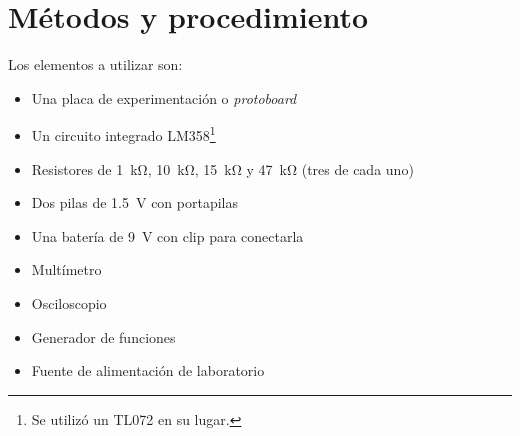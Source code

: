 \section{Métodos y procedimiento}

Los elementos a utilizar son:

\begin{itemize}
    \item Una placa de experimentación o \textit{protoboard}
    \item Un circuito integrado LM358\footnote{Se utilizó un TL072 en su lugar.}
    \item Resistores de \SI{1}{\kilo\ohm}, \SI{10}{\kilo\ohm}, \SI{15}{\kilo\ohm} y \SI{47}{\kilo\ohm} (tres de cada uno)
    \item Dos pilas de \SI{1.5}{\volt} con portapilas
    \item Una batería de \SI{9}{\volt} con clip para conectarla
    \item Multímetro
    \item Osciloscopio
    \item Generador de funciones
    \item Fuente de alimentación de laboratorio
\end{itemize}
